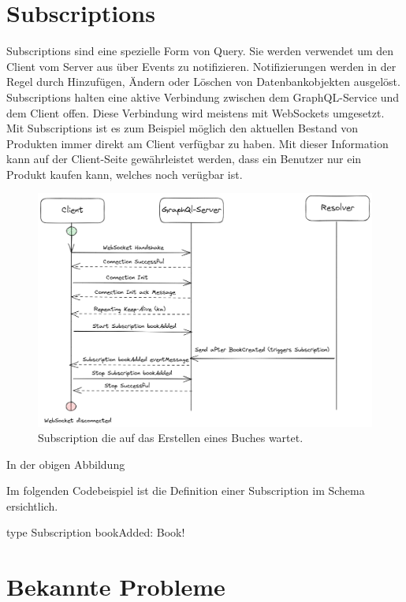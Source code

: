 \section{Subscriptions}

Subscriptions sind eine spezielle Form von Query.
Sie werden verwendet um den Client vom Server aus über Events zu notifizieren.
Notifizierungen werden in der Regel durch Hinzufügen, Ändern oder Löschen von Datenbankobjekten ausgelöst.
Subscriptions halten eine aktive Verbindung zwischen dem GraphQL-Service und dem Client offen.
Diese Verbindung wird meistens mit WebSockets umgesetzt.
Mit Subscriptions ist es zum Beispiel möglich den aktuellen Bestand von Produkten immer direkt am Client verfügbar zu haben.
Mit dieser Information kann auf der Client-Seite gewährleistet werden, dass ein Benutzer nur ein Produkt kaufen kann, welches noch verügbar ist.
\newline

\begin{figure}[H]
    \includegraphics[width=\textwidth]{pics/SubscriptionWebSocket.png}
    \caption{Subscription die auf das Erstellen eines Buches wartet.}
\end{figure}

In der obigen Abbildung

Im folgenden Codebeispiel ist die Definition einer Subscription im Schema ersichtlich.

\begin{JsCode}
type Subscription {
    bookAdded: Book!
}
\end{JsCode}


\section{Bekannte Probleme}

